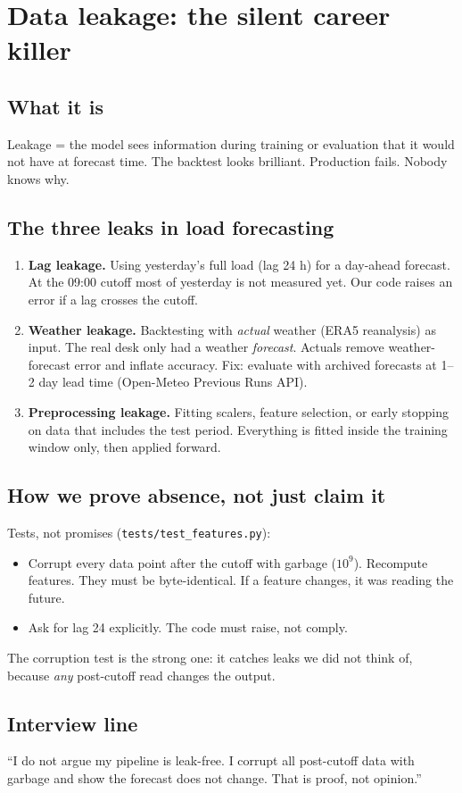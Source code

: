 \section{Data leakage: the silent career killer}

\subsection{What it is}

Leakage = the model sees information during training or evaluation that it
would not have at forecast time. The backtest looks brilliant. Production
fails. Nobody knows why.

\subsection{The three leaks in load forecasting}

\begin{enumerate}
  \item \textbf{Lag leakage.} Using yesterday's full load (lag 24 h) for a
        day-ahead forecast. At the 09:00 cutoff most of yesterday is not
        measured yet. Our code raises an error if a lag crosses the cutoff.
  \item \textbf{Weather leakage.} Backtesting with \emph{actual} weather (ERA5
        reanalysis) as input. The real desk only had a weather \emph{forecast}.
        Actuals remove weather-forecast error and inflate accuracy.
        Fix: evaluate with archived forecasts at 1--2 day lead time
        (Open-Meteo Previous Runs API).
  \item \textbf{Preprocessing leakage.} Fitting scalers, feature selection, or
        early stopping on data that includes the test period. Everything is
        fitted inside the training window only, then applied forward.
\end{enumerate}

\subsection{How we prove absence, not just claim it}

Tests, not promises (\texttt{tests/test\_features.py}):

\begin{itemize}
  \item Corrupt every data point after the cutoff with garbage ($10^9$).
        Recompute features. They must be byte-identical. If a feature changes,
        it was reading the future.
  \item Ask for lag 24 explicitly. The code must raise, not comply.
\end{itemize}

The corruption test is the strong one: it catches leaks we did not think of,
because \emph{any} post-cutoff read changes the output.

\subsection{Interview line}

``I do not argue my pipeline is leak-free. I corrupt all post-cutoff data with
garbage and show the forecast does not change. That is proof, not opinion.''

